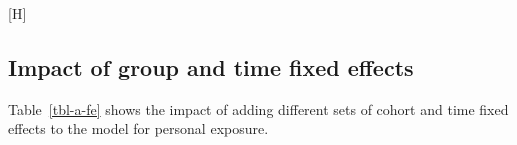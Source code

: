 \documentclass[
  letterpaper,
  DIV=11,
  numbers=noendperiod]{scrartcl}
\makeatletter
\renewenvironment{figure}%
   {\renewcommand\familydefault\sfdefault
    \@float{figure}}
   {\end@float}
\makeatother
\begin{document}
\begin{figure}[H]

\caption{\label{fig-afig-pt-resp}Comparison of pre-intervention trends
in self-reported respiratory outcomes between waves 1 and 2 for never
treated and villages treated later.}


\end{figure}%

\newpage

\subsection{Impact of group and time fixed
effects}\label{impact-of-group-and-time-fixed-effects}

Table~\ref{tbl-a-fe} shows the impact of adding different sets of cohort
and time fixed effects to the model for personal exposure.
\end{document}
